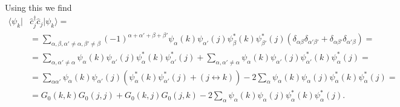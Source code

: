 \documentclass[english, parskip=full]{scrartcl}
\newcommand{\kla}{}
\begin{document}
Using this we find
\begin{align}
\langle \psi_k | & \hat{c}_j^\dagger \hat{c}_j | \psi_k \rangle = \\  &= \sum_{\alpha,\beta,\alpha'\neq\alpha, \beta'\neq\beta} (-1)^{\alpha+\alpha' + \beta+\beta'} \psi_\alpha(k)\psi_{\alpha'}(j) \psi_\beta^\ast(k) \psi_{\beta'}^\ast(j) \kla\left( \delta_{\alpha\beta} \delta_{\alpha'\beta'} + \delta_{\alpha\beta'} \delta_{\alpha'\beta} \right) = \\
&= \sum_{\alpha, \alpha'\neq\alpha} \psi_\alpha(k)\psi_{\alpha'}(j) \psi_\alpha^\ast(k) \psi_{\alpha'}^\ast(j) + \sum_{\alpha, \alpha'\neq\alpha} \psi_\alpha(k)\psi_{\alpha'}(j) \psi_{\alpha'}^\ast(k) \psi_{\alpha}^\ast(j) = \\
&= \sum_{\alpha\alpha'} \psi_\alpha(k) \psi_{\alpha'}(j) \kla\left( \psi_\alpha^\ast(k) \psi_{\alpha'}^\ast(j) + (j\leftrightarrow k) \right) - 2\sum_{\alpha} \psi_\alpha(k) \psi_{\alpha}(j)  \psi_\alpha^\ast(k) \psi_{\alpha}^\ast(j) = \\
&= G_0(k,k)G_0(j,j) + G_0(k,j)G_0(j,k) - 2\sum_{\alpha} \psi_\alpha(k) \psi_{\alpha}(j)  \psi_\alpha^\ast(k) \psi_{\alpha}^\ast(j).
\end{align}
\end{document}
